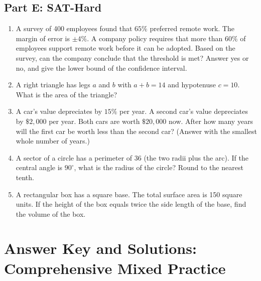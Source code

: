 \documentclass[14pt]{extarticle}
\begin{document}
\subsection*{Part E: SAT-Hard}
\begin{enumerate}
  \item A survey of 400 employees found that \(65\%\) preferred remote work. The margin of error is \(\pm 4\%\). A company policy requires that more than \(60\%\) of employees support remote work before it can be adopted. Based on the survey, can the company conclude that the threshold is met? Answer yes or no, and give the lower bound of the confidence interval.
  \item A right triangle has legs \(a\) and \(b\) with \(a + b = 14\) and hypotenuse \(c = 10\). What is the area of the triangle?
  \item A car's value depreciates by \(15\%\) per year. A second car's value depreciates by \(\$2{,}000\) per year. Both cars are worth \(\$20{,}000\) now. After how many years will the first car be worth less than the second car? (Answer with the smallest whole number of years.)
  \item A sector of a circle has a perimeter of 36 (the two radii plus the arc). If the central angle is \(90^\circ\), what is the radius of the circle? Round to the nearest tenth.
  \item A rectangular box has a square base. The total surface area is 150 square units. If the height of the box equals twice the side length of the base, find the volume of the box.
\end{enumerate}

\newpage

\section*{Answer Key and Solutions: Comprehensive Mixed Practice}
\end{document}
